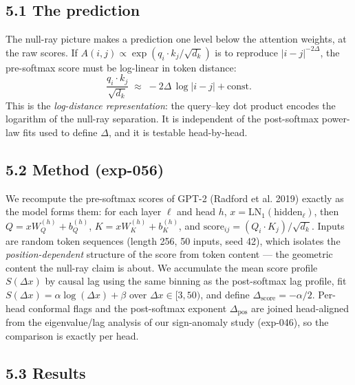 \subsection{5.1 The prediction}\label{the-prediction}

The null-ray picture makes a prediction one level below the attention
weights, at the raw scores. If
\(A(i,j) \propto \exp(q_i\!\cdot\!k_j/\sqrt{d_k})\) is to reproduce
\(|i-j|^{-2\Delta}\), the pre-softmax score must be log-linear in token
distance: \[
\frac{q_i \cdot k_j}{\sqrt{d_k}} \;\approx\; -2\Delta\,\log|i-j| + \text{const}.
\tag{$\ast$}
\] This is the \emph{log-distance representation}: the query--key dot
product encodes the logarithm of the null-ray separation. It is
independent of the post-softmax power-law fits used to define
\(\Delta\), and it is testable head-by-head.

\subsection{5.2 Method (exp-056)}\label{method-exp-056}

We recompute the pre-softmax scores of GPT-2 (Radford et al. 2019)
exactly as the model forms them: for each layer \(\ell\) and head \(h\),
\(x = \mathrm{LN}_1(\text{hidden}_\ell)\), then
\(Q = x W_Q^{(h)} + b_Q^{(h)}\), \(K = x W_K^{(h)} + b_K^{(h)}\), and
\(\text{score}_{ij} = (Q_i \cdot K_j)/\sqrt{d_k}\). Inputs are random
token sequences (length 256, 50 inputs, seed 42), which isolates the
\emph{position-dependent} structure of the score from token content ---
the geometric content the null-ray claim is about. We accumulate the
mean score profile \(S(\Delta x)\) by causal lag using the same binning
as the post-softmax lag profile, fit
\(S(\Delta x) = \alpha\log(\Delta x) + \beta\) over
\(\Delta x \in [3, 50)\), and define
\(\Delta_{\text{score}} = -\alpha/2\). Per-head conformal flags and the
post-softmax exponent \(\Delta_{\text{pos}}\) are joined head-aligned
from the eigenvalue/lag analysis of our sign-anomaly study (exp-046), so
the comparison is exactly per head.

\subsection{5.3 Results}\label{results}


